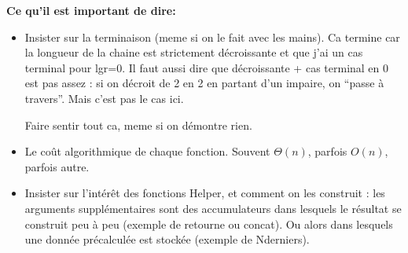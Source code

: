 \documentclass[10pt]{article}\usepackage[correction,nu]{esial}
\begin{document}
\begin{Reponse}
  \textbf{Ce qu'il est important de dire:}
  \begin{itemize}
  \item Insister sur la terminaison (meme si on le fait avec les mains). Ca
    termine car la longueur de la chaine est strictement décroissante et que
    j'ai un cas terminal pour lgr=0. Il faut aussi dire que décroissante + cas
    terminal en 0 est pas assez : si on décroit de 2 en 2 en partant d'un
    impaire, on ``passe à travers''. Mais c'est pas le cas ici. 

    Faire sentir tout ca, meme si on démontre rien.
  \item Le coût algorithmique de chaque fonction. Souvent $\Theta(n)$, parfois
    $O(n)$, parfois autre.
  \item Insister sur l'intérêt des fonctions Helper, et comment on les
    construit : les arguments supplémentaires sont des accumulateurs dans
    lesquels le résultat se construit peu à peu (exemple de retourne ou
    concat). Ou alors dans lesquels une donnée précalculée est stockée (exemple
    de Nderniers).
  \end{itemize}
\end{Reponse}
\end{document}
